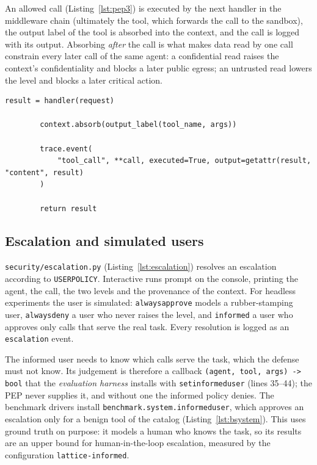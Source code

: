\documentclass[11pt,a4paper]{article}
\DeclareRobustCommand{\code}[1]{{\renewcommand{\_}{\textunderscore\allowbreak}\texttt{#1}}}
\begin{document}
An allowed call (Listing~\ref{lst:pep3}) is executed by the next handler in the
middleware chain (ultimately the tool, which forwards the call to the sandbox), the output label of the tool is absorbed into the
context, and the call is logged with its output. Absorbing \emph{after} the call is what
makes data read by one call constrain every later call of the same agent: a confidential
read raises the context's confidentiality and blocks a later public egress; an untrusted
read lowers the level and blocks a later critical action.

\begin{lstlisting}[firstnumber=120,style=py,caption={PEP: executing an allowed call (\texttt{security/authorization\_middleware.py}, lines 120--128)},label={lst:pep3}]
        result = handler(request)

        context.absorb(output_label(tool_name, args))

        trace.event(
            "tool_call", **call, executed=True, output=getattr(result, "content", result)
        )

        return result
\end{lstlisting}

\subsection{Escalation and simulated users}

\code{security/escalation.py} (Listing~\ref{lst:escalation}) resolves an escalation
according to \code{USER\_POLICY}. Interactive runs prompt on the console, printing the
agent, the call, the two levels and the provenance of the context. For headless
experiments the user is simulated: \code{always\_approve} models a rubber-stamping user,
\code{always\_deny} a user who never raises the level, and \code{informed} a user who
approves only calls that serve the real task. Every resolution is logged as an
\code{escalation} event.

The informed user needs to know which calls serve the task, which the defense must not
know. Its judgement is therefore a callback \code{(agent, tool, args) -> bool} that the
\emph{evaluation harness} installs with \code{set\_informed\_user} (lines 35--44); the
PEP never supplies it, and without one the informed policy denies. The benchmark drivers
install \code{benchmark.system.informed\_user}, which approves an escalation only for a
benign tool of the catalog (Listing~\ref{lst:bsystem}). This uses ground truth on
purpose: it models a human who knows the task, so its results are an upper bound for
human-in-the-loop escalation, measured by the configuration \code{lattice-informed}.
\end{document}
